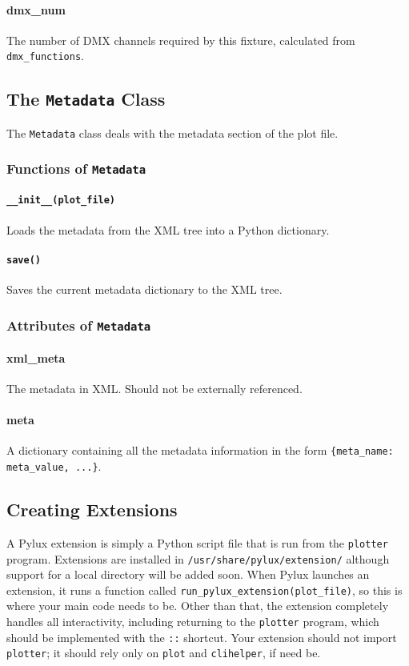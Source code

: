 \documentclass[a4paper]{article}
\begin{document}
\paragraph{dmx\_num}
The number of DMX channels required by this fixture, calculated from 
\texttt{dmx\_functions}.

\subsection{The \texttt{Metadata} Class}
The \texttt{Metadata} class deals with the metadata section of the plot file.

\subsubsection{Functions of \texttt{Metadata}}

\paragraph{\texttt{\_\_init\_\_(plot\_file)}}
Loads the metadata from the XML tree into a Python dictionary.

\paragraph{\texttt{save()}}
Saves the current metadata dictionary to the XML tree.

\subsubsection{Attributes of \texttt{Metadata}}

\paragraph{xml\_meta}
The metadata in XML. Should not be externally referenced.

\paragraph{meta}
A dictionary containing all the metadata information in the form 
\texttt{\{meta\_name: meta\_value, ...\}}.

\subsection{Creating Extensions}
A Pylux extension is simply a Python script file that is run from the 
\texttt{plotter} program. Extensions are installed in 
\texttt{/usr/share/pylux/extension/} although support for a local 
directory will be added soon. When Pylux launches an extension, it runs a 
function called \texttt{run\_pylux\_extension(plot\_file)}, so this is 
where your main code needs to be. Other than that, the extension 
completely handles all interactivity, including returning to the 
\texttt{plotter} program, which should be implemented with the \texttt{::} 
shortcut. Your extension should not import \texttt{plotter}; it should 
rely only on \texttt{plot} and \texttt{clihelper}, if need be.
\end{document}

